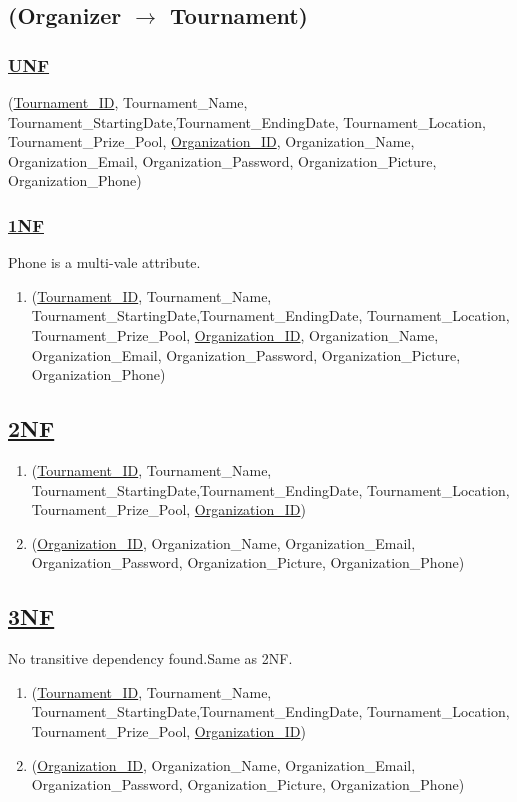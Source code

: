 \subsection{\texorpdfstring{\centering (Organizer $\rightarrow$ Tournament)}{(Organizer - Tournament)}}


\subsubsection*{\underline{UNF}}

(\underline{Tournament\_ID}, Tournament\_Name, Tournament\_StartingDate,Tournament\_EndingDate, Tournament\_Location, Tournament\_Prize\_Pool,
\underline{Organization\_ID}, Organization\_Name, Organization\_Email, Organization\_Password, Organization\_Picture, Organization\_Phone)



\subsubsection*{\underline{1NF}}
Phone is a multi-vale attribute.

\begin{enumerate}
    \item (\underline{Tournament\_ID}, Tournament\_Name, Tournament\_StartingDate,Tournament\_EndingDate, Tournament\_Location, Tournament\_Prize\_Pool,
          \underline{Organization\_ID}, Organization\_Name, Organization\_Email, Organization\_Password, Organization\_Picture, Organization\_Phone)
\end{enumerate}


\subsection*{\underline{2NF}}
\begin{enumerate}
    \item(\underline{Tournament\_ID}, Tournament\_Name, Tournament\_StartingDate,Tournament\_EndingDate, Tournament\_Location, Tournament\_Prize\_Pool, \underline{Organization\_ID})
    \item (\underline{Organization\_ID}, Organization\_Name, Organization\_Email, Organization\_Password, Organization\_Picture, Organization\_Phone)
\end{enumerate}

\subsection*{\underline{3NF}}
No transitive dependency found.Same as 2NF.
\begin{enumerate}
    \item(\underline{Tournament\_ID}, Tournament\_Name, Tournament\_StartingDate,Tournament\_EndingDate, Tournament\_Location, Tournament\_Prize\_Pool, \underline{Organization\_ID})
    \item (\underline{Organization\_ID}, Organization\_Name, Organization\_Email, Organization\_Password, Organization\_Picture, Organization\_Phone)
\end{enumerate}

